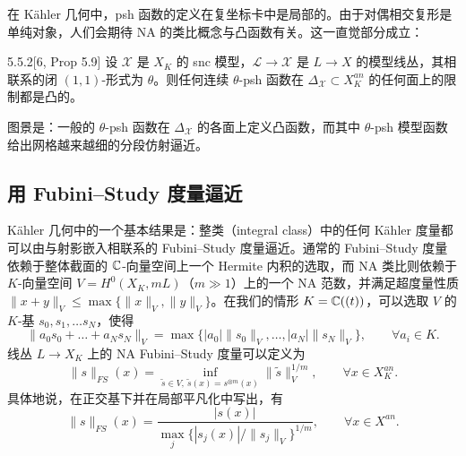 在 Kähler 几何中，psh 函数的定义在复坐标卡中是局部的。由于对偶相交复形是单纯对象，人们会期待 NA 的类比概念与凸函数有关。这一直觉部分成立：

\begin{proposition}{5.5.2}[6, Prop 5.9]
设 $\mathcal X$ 是 $X_K$ 的 snc 模型，$\mathcal L\to\mathcal X$ 是 $L\to X$ 的模型线丛，其相联系的闭 $(1,1)$-形式为 $\theta$。则任何连续 $\theta$-psh 函数在 $\Delta_{\mathcal X}\subset X_K^{an}$ 的任何面上的限制都是凸的。
\end{proposition}


图景是：一般的 $\theta$-psh 函数在 $\Delta_{\mathcal X}$ 的各面上定义凸函数，而其中 $\theta$-psh 模型函数给出网格越来越细的分段仿射逼近。

\subsection{用 Fubini--Study 度量逼近}
Kähler 几何中的一个基本结果是：整类（integral class）中的任何 Kähler 度量都可以由与射影嵌入相联系的 Fubini--Study 度量逼近。通常的 Fubini--Study 度量依赖于整体截面的 $\mathbb{C}$-向量空间上一个 Hermite 内积的选取，而 NA 类比则依赖于 $K$-向量空间 $V=H^0(X_K,mL)$（$m\gg 1$）上的一个 NA 范数，并满足超度量性质 $\|x+y\|_V\le\max\{\|x\|_V,\|y\|_V\}$。在我们的情形 $K=\mathbb{C}((t))$，可以选取 $V$ 的 $K$-基 $s_0,s_1,\dots s_N$，使得
\[
\|a_0s_0+\dots+a_Ns_N\|_V=\max\{|a_0|\|s_0\|_V,\dots,|a_N|\|s_N\|_V\},\qquad \forall a_i\in K.
\]
线丛 $L\to X_K$ 上的 NA Fubini--Study 度量可以定义为
\[
\|s\|_{FS}(x)=\inf_{\tilde s\in V,\ \tilde s(x)=s^{\otimes m}(x)}\|\tilde s\|_V^{1/m},\qquad \forall x\in X_K^{an}.
\]
具体地说，在正交基下并在局部平凡化中写出，有
\begin{equation}
\|s\|_{FS}(x)=\frac{|s(x)|}{\max_j\{|s_j(x)|/\|s_j\|_V\}^{1/m}},\qquad \forall x\in X^{an}. \tag{5.14}
\end{equation}


